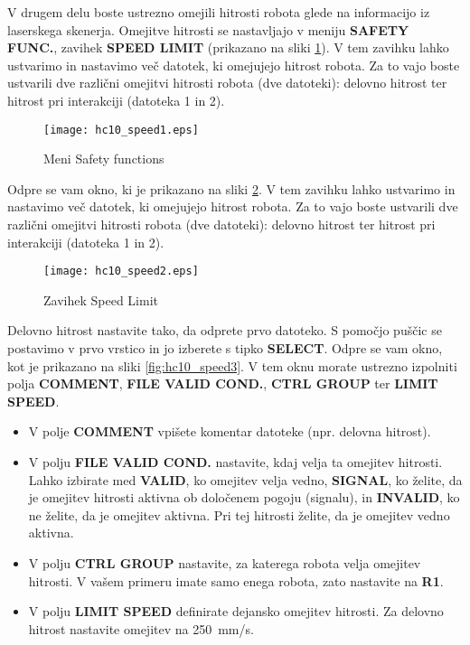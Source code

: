 V drugem delu boste ustrezno omejili hitrosti robota glede na informacijo iz laserskega skenerja. Omejitve hitrosti se nastavljajo v meniju \textbf{SAFETY FUNC.}, zavihek \textbf{SPEED LIMIT} (prikazano na sliki \ref{fig:hc10_speed1}). V tem zavihku lahko ustvarimo in nastavimo več datotek, ki omejujejo hitrost robota. Za to vajo boste ustvarili dve različni omejitvi hitrosti robota (dve datoteki): delovno hitrost ter hitrost pri interakciji (datoteka 1 in 2).

\begin{figure}[!hbt]
	\centering
	\texttt{[image: hc10\_speed1.eps]}
	\caption{Meni Safety functions}
	\label{fig:hc10_speed1}
\end{figure}

Odpre se vam okno, ki je prikazano na sliki \ref{fig:hc10_speed2}. V tem zavihku lahko ustvarimo in nastavimo več datotek, ki omejujejo hitrost robota. Za to vajo boste ustvarili dve različni omejitvi hitrosti robota (dve datoteki): delovno hitrost ter hitrost pri interakciji (datoteka 1 in 2).

\begin{figure}[!hbt]
	\centering
	\texttt{[image: hc10\_speed2.eps]}
	\caption{Zavihek Speed Limit}
	\label{fig:hc10_speed2}
\end{figure}

Delovno hitrost nastavite tako, da odprete prvo datoteko. S pomočjo puščic se postavimo v prvo vrstico in jo izberete s tipko \textbf{SELECT}. Odpre se vam okno, kot je prikazano na sliki \ref{fig:hc10_speed3}. V tem oknu morate ustrezno izpolniti polja \textbf{COMMENT}, \textbf{FILE VALID COND.}, \textbf{CTRL GROUP} ter \textbf{LIMIT SPEED}.

\begin{itemize}
	\item V polje \textbf{COMMENT} vpišete komentar datoteke (npr. delovna hitrost).
	\item V polju \textbf{FILE VALID COND.} nastavite, kdaj velja ta omejitev hitrosti. Lahko izbirate med \textbf{VALID}, ko omejitev velja vedno, \textbf{SIGNAL}, ko želite, da je omejitev hitrosti aktivna ob določenem pogoju (signalu), in {\textbf{INVALID}}, ko ne želite, da je omejitev aktivna. Pri tej hitrosti želite, da je omejitev vedno aktivna.
	\item V polju \textbf{CTRL GROUP} nastavite, za katerega robota velja omejitev hitrosti. V vašem primeru imate samo enega robota, zato nastavite na \textbf{R1}.
	\item V polju \textbf{LIMIT SPEED} definirate dejansko omejitev hitrosti. Za delovno hitrost nastavite omejitev na 250~mm/s.
\end{itemize}


